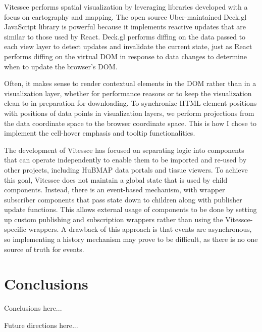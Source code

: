 \documentclass[12pt, letterpaper]{article}
\begin{document}
Vitessce performs spatial visualization by leveraging libraries developed with a focus on cartography and mapping.
The open source Uber-maintained Deck.gl JavaScript library is powerful because it implements reactive updates that are similar to those used by React.
Deck.gl performs diffing on the data passed to each view layer to detect updates and invalidate the current state, just as React performs diffing on the virtual DOM in response to data changes to determine when to update the browser's DOM.

Often, it makes sense to render contextual elements in the DOM rather than in a visualization layer, whether for performance reasons or to keep the visualization clean to in preparation for downloading.
To synchronize HTML element positions with positions of data points in visualization layers, we perform projections from the data coordinate space to the browser coordinate space.
This is how I chose to implement the cell-hover emphasis and tooltip functionalities.

The development of Vitessce has focused on separating logic into components that can operate independently to enable them to be imported and re-used by other projects, including HuBMAP data portals and tissue viewers.
To achieve this goal, Vitessce does not maintain a global state that is used by child components.
Instead, there is an event-based mechanism, with wrapper subscriber components that pass state down to children along with publisher update functions.
This allows external usage of components to be done by setting up custom publishing and subscription wrappers rather than using the Vitessce-specific wrappers.
A drawback of this approach is that events are asynchronous, so implementing a history mechanism may prove to be difficult, as there is no one source of truth for events.


\section{Conclusions}
Conclusions here...


Future directions here...





{}

\end{document}

